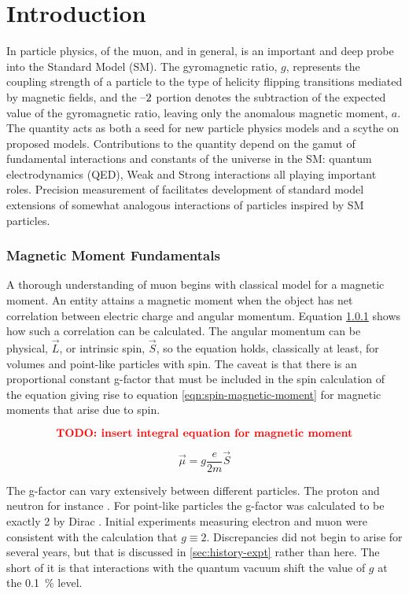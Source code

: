 \chapter {Introduction}
In particle physics, \gmtwo of the muon, and \gmtwo in general, is an important and deep probe into the Standard Model (SM). The gyromagnetic ratio, $g$, represents the coupling strength of a particle to the type of helicity flipping transitions mediated by magnetic fields, and the $\hbox{--}2$ portion denotes the subtraction of the expected value of the gyromagnetic ratio, leaving only the anomalous magnetic moment, $a$.  The quantity acts as both a seed for new particle physics models and a scythe on proposed models.   Contributions to the quantity depend on the gamut of fundamental interactions and constants of the universe in the SM: quantum electrodynamics (QED), Weak and Strong interactions all playing important roles.  Precision measurement of \gmtwo facilitates development of standard model extensions of somewhat analogous interactions of particles inspired by SM particles.

\subsection{Magnetic Moment Fundamentals}

A thorough understanding of muon \gmtwo begins with classical model for a magnetic moment.  An entity attains a magnetic moment when the object has net correlation between electric charge and angular momentum.  Equation \ref{} shows how such a correlation can be calculated.  The angular momentum can be physical, $\vec{L}$, or intrinsic spin, $\vec{S}$, so the equation holds, classically at least, for volumes and point-like particles with spin. The caveat is that there is an proportional constant g-factor that must be included in the spin calculation of the equation giving rise to equation \ref{eqn:spin-magnetic-moment} for magnetic moments that arise due to spin.

\begin{equation}
\label{eqn:magnetic-moment-integral}
\textbf{\color{red}{TODO: insert integral equation for magnetic moment}} 
\end{equation}

\begin{equation}
\label{eqn:spin-magnetic-moment}
\vec{\mu} = g \frac{e}{2m}\vec{S}
\end{equation}

The g-factor can vary extensively between different particles.  The proton and neutron for instance .  For point-like particles the g-factor was calculated to be exactly 2 by Dirac .  Initial experiments measuring electron and muon \gmtwo were consistent with the calculation that $g\equiv2$.  Discrepancies did not begin to arise for several years, but that is discussed in \ref{sec:history-expt} rather than here.  The short of it is that interactions with the quantum vacuum shift the value of $g$ at the \SI{0.1}{\percent} level.

